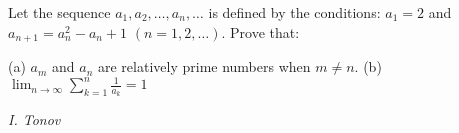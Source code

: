 Let the sequence $a_1,a_2,\ldots,a_n,\ldots$ is defined by the conditions: $a_1=2$ and $a_{n+1}=a_n^2-a_n+1$ $(n=1,2,\ldots)$. Prove that:

(a) $a_m$ and $a_n$ are relatively prime numbers when $m\ne n$.
(b) $\lim_{n\to\infty}\sum_{k=1}^n\frac1{a_k}=1$

\textit{I. Tonov}